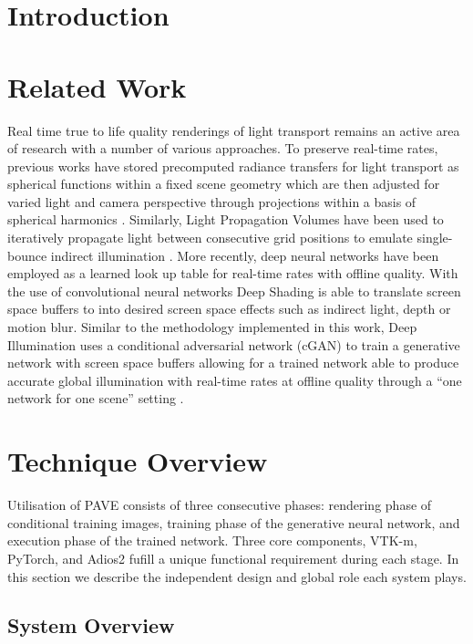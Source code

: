 \documentclass[sigconf]{acmart}%
\begin{document}
\section{Introduction}


\section{Related Work}

Real time true to life quality renderings of light transport remains an active area of research with a number of various approaches. To preserve real-time rates, previous works have stored precomputed radiance transfers for light transport as spherical functions within a fixed scene geometry which are then adjusted for varied light and camera perspective through projections within a basis of spherical harmonics \cite{sloanPrecompRad}. Similarly, Light Propagation Volumes have been used to iteratively propagate light between consecutive grid positions to emulate single-bounce indirect illumination \cite{kaplanyanCasac}. More recently, deep neural  networks have been employed as a learned look up table for real-time rates with offline quality. With the use of convolutional neural networks Deep Shading is able to translate screen space buffers to into desired screen space effects such as indirect light, depth or motion blur. Similar to the methodology implemented in this work, Deep Illumination uses a conditional adversarial network (cGAN) to train a generative network with screen space buffers allowing for a trained network able to produce accurate global illumination with real-time rates at offline quality through a ``one network for one scene'' setting  \cite{deepillum}.

\section{Technique Overview}

Utilisation of PAVE consists of three consecutive phases: rendering phase of conditional training images, training phase of the generative neural network, and execution phase of the trained network. Three core components, VTK-m, PyTorch, and Adios2 fufill a unique functional requirement during each stage. In this section we describe the independent design and global role each system plays.

\subsection{System Overview}
 
\end{document}
